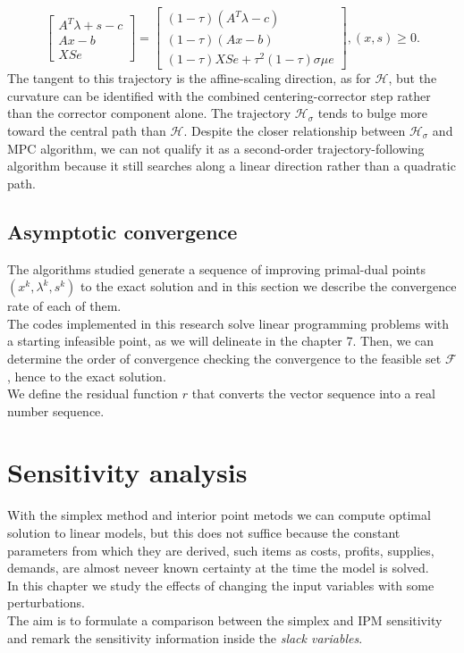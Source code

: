 \documentclass[a4paper,10 pt,titlepage,twoside]{book}
\theoremstyle{plain}
\theoremstyle{definition}
\theoremstyle{remark}
\begin{document}
\begin{equation}\label{T}
\begin{bmatrix}
A^{T}\lambda+s-c \\Ax-b \\XSe
\end{bmatrix}=\begin{bmatrix}
(1-\tau)(A^{T}\lambda-c)\\(1-\tau)(Ax-b)\\(1-\tau)XSe+\tau^{2}(1-\tau)\sigma\mu e
\end{bmatrix},(x,s)\geq0.
\end{equation}
The tangent to this trajectory is the affine-scaling direction, as for $\mathcal{H}$, but the curvature can be identified with the combined centering-corrector step rather than the corrector component alone. The trajectory $\mathcal{H}_{\sigma}$ tends to bulge more toward the central path than $\mathcal{H}$. Despite the closer relationship between $\mathcal{H}_{\sigma}$  and MPC algorithm, we can not qualify it as a second-order trajectory-following algorithm because it still searches along a linear direction rather than a quadratic path.  
\section{Asymptotic convergence}
The algorithms studied generate a sequence of improving primal-dual points $(x^{k},\lambda^{k}, s^{k})$ to the exact solution and in this section we describe the convergence rate of each of them. \\
The codes implemented in this research solve linear programming problems with a starting infeasible point, as we will delineate in the chapter 7. Then, we can determine the order of convergence checking the convergence to the feasible set $\mathcal{F}$, hence to the exact solution.\\
We define the residual function $r$ that converts the vector sequence into a real number sequence.
\chapter{Sensitivity analysis}
With the simplex method and interior point metods we can compute optimal solution to linear models, but this does not suffice because the constant parameters from which they are derived, such items as costs, profits, supplies, demands, are almost neveer known certainty at the time the model is solved.\\
In this chapter we study the effects of changing the input variables with some perturbations.\\ The aim is to formulate a comparison between the simplex and IPM sensitivity and remark the sensitivity information inside the \textit{slack variables}.
\end{document}
